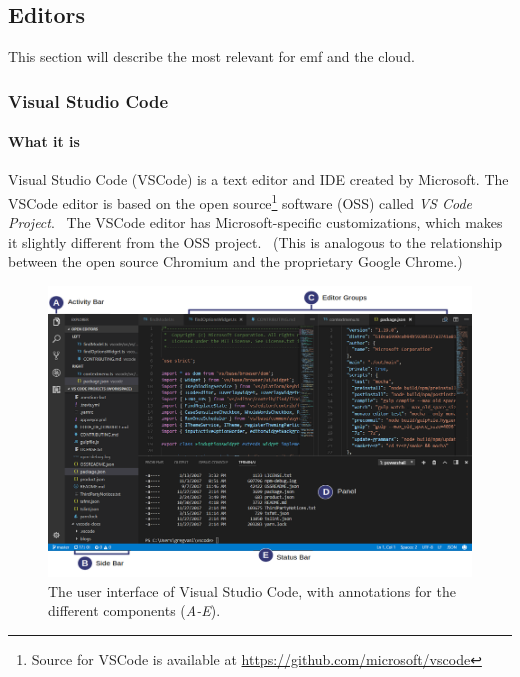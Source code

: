\subsection{Editors}\label{sec:editors}

This section will describe the most relevant  for \acrlong{emf} and the \gls{cloud}.

\subsubsection{Visual Studio Code}\label{sec:vscode}

\paragraph*{What it is}
Visual Studio Code (\gls{VSCode}) is a text editor and \acrfull{IDE} created by
Microsoft. The VSCode editor is based on the \gls{open source}\footnote{Source for VSCode is available at \href{https://github.com/microsoft/vscode}{https://github.com/microsoft/vscode}} software (OSS) called \emph{VS Code Project}.~\cite{helmingEclipseTheiaIDE2019} 
The VSCode editor has Microsoft-specific customizations, which makes it slightly different from the OSS project.~\cite{MicrosoftVscode2020} (This is analogous to the relationship between the \gls{open source} Chromium and the proprietary Google Chrome.)

\begin{figure}[htbp]
  \centering
  \includegraphics[width=\textwidth]{figures/vscode-ui}
  \caption[Visual Studio Code User Interface]{The user interface of Visual Studio Code, with annotations for the different components (\emph{A-E}).\cite{microsoftVisualStudioCode2020}}\label{fig:vscode-ui}
\end{figure}

